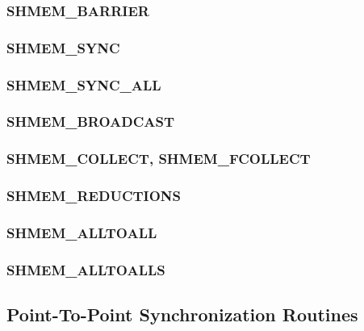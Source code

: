 \documentclass[10pt]{book}
\begin{document}
\subsubsection{\textbf{SHMEM\_BARRIER}}\label{subsec:shmem_barrier}


\subsubsection{\textbf{SHMEM\_SYNC}}\label{subsec:shmem_sync}


\subsubsection{\textbf{SHMEM\_SYNC\_ALL}}\label{subsec:shmem_sync_all}


\subsubsection{\textbf{SHMEM\_BROADCAST}}\label{subsec:shmem_broadcast}


\subsubsection{\textbf{SHMEM\_COLLECT, SHMEM\_FCOLLECT}}\label{subsec:shmem_collect}


\subsubsection{\textbf{SHMEM\_REDUCTIONS}}\label{subsec:shmem_reductions}


\subsubsection{\textbf{SHMEM\_ALLTOALL}}\label{subsec:shmem_alltoall}


\subsubsection{\textbf{SHMEM\_ALLTOALLS}}\label{subsec:shmem_alltoalls}





\subsection{Point-To-Point Synchronization Routines}\label{subsec:p2p_intro}

\end{document}
